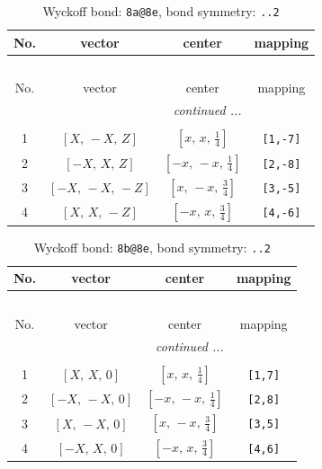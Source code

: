 \documentclass[fleqn,8pt]{jsarticle}
\begin{document}
\begin{longtable}{cccc}
\caption{Wyckoff bond: {\tt 8a@8e}, bond symmetry: {\tt ..2}}
 \\
 \hline \hline
No. & vector & center & mapping \\ \hline \endfirsthead

\multicolumn{3}{l}{\tablename\ \thetable{}} \\
 \hline \hline
No. & vector & center & mapping \\ \hline \endhead

 \hline \hline
\multicolumn{3}{r}{\footnotesize\it continued ...} \\ \endfoot

 \hline \hline
\multicolumn{3}{r}{} \\ \endlastfoot

1 & $\left[ X,\, - X,\, Z \right]$ & $\left[ x,\, x,\, \frac{1}{4} \right]$ & {\tt [1,-7]} \\ \hline
2 & $\left[ - X,\, X,\, Z \right]$ & $\left[ - x,\, - x,\, \frac{1}{4} \right]$ & {\tt [2,-8]} \\ \hline
3 & $\left[ - X,\, - X,\, - Z \right]$ & $\left[ x,\, - x,\, \frac{3}{4} \right]$ & {\tt [3,-5]} \\ \hline
4 & $\left[ X,\, X,\, - Z \right]$ & $\left[ - x,\, x,\, \frac{3}{4} \right]$ & {\tt [4,-6]} \\
\end{longtable}
\renewcommand{\arraystretch}{1.2}
\begin{longtable}{cccc}
\caption{Wyckoff bond: {\tt 8b@8e}, bond symmetry: {\tt ..2}}
 \\
 \hline \hline
No. & vector & center & mapping \\ \hline \endfirsthead

\multicolumn{3}{l}{\tablename\ \thetable{}} \\
 \hline \hline
No. & vector & center & mapping \\ \hline \endhead

 \hline \hline
\multicolumn{3}{r}{\footnotesize\it continued ...} \\ \endfoot

 \hline \hline
\multicolumn{3}{r}{} \\ \endlastfoot

1 & $\left[ X,\, X,\, 0 \right]$ & $\left[ x,\, x,\, \frac{1}{4} \right]$ & {\tt [1,7]} \\ \hline
2 & $\left[ - X,\, - X,\, 0 \right]$ & $\left[ - x,\, - x,\, \frac{1}{4} \right]$ & {\tt [2,8]} \\ \hline
3 & $\left[ X,\, - X,\, 0 \right]$ & $\left[ x,\, - x,\, \frac{3}{4} \right]$ & {\tt [3,5]} \\ \hline
4 & $\left[ - X,\, X,\, 0 \right]$ & $\left[ - x,\, x,\, \frac{3}{4} \right]$ & {\tt [4,6]} \\
\end{longtable}
\end{document}
